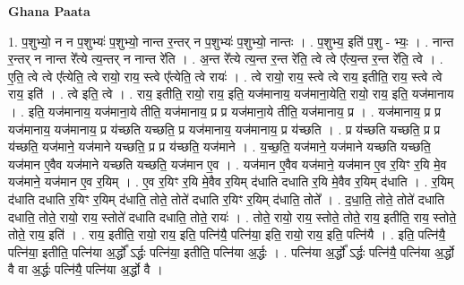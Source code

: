 \documentclass[17pt]{extarticle}
\begin{document}
\textbf{Ghana Paata } \newline

1. प॒शुभ्यो॒ न न प॒शुभ्यः॑ प॒शुभ्यो॒ नान्त र॒न्तर् न प॒शुभ्यः॑ प॒शुभ्यो॒ नान्तः । . प॒शुभ्य॒ इति॑ प॒शु - भ्यः॒ । . नान्त र॒न्तर् न नान्त रे᳚त्ये त्य॒न्तर् न नान्त रे॑ति । . अ॒न्त रे᳚त्ये त्य॒न्त र॒न्त रे॑ति॒ त्वे त्वे ए᳚त्य॒न्त र॒न्त रे॑ति॒ त्वे । . ए॒ति॒ त्वे त्वे ए᳚त्येति॒ त्वे रायो॒ राय॒ स्त्वे ए᳚त्येति॒ त्वे रायः॑ । . त्वे रायो॒ राय॒ स्त्वे त्वे राय॒ इतीति॒ राय॒ स्त्वे त्वे राय॒ इति॑ । . त्वे इति॒ त्वे । . राय॒ इतीति॒ रायो॒ राय॒ इति॒ यज॑मानाय॒ यज॑माना॒येति॒ रायो॒ राय॒ इति॒ यज॑मानाय । . इति॒ यज॑मानाय॒ यज॑माना॒ये तीति॒ यज॑मानाय॒ प्र प्र यज॑माना॒ये तीति॒ यज॑मानाय॒ प्र । . यज॑मानाय॒ प्र प्र यज॑मानाय॒ यज॑मानाय॒ प्र य॑च्छति यच्छति॒ प्र यज॑मानाय॒ यज॑मानाय॒ प्र य॑च्छति । . प्र य॑च्छति यच्छति॒ प्र प्र य॑च्छति॒ यज॑माने॒ यज॑माने यच्छति॒ प्र प्र य॑च्छति॒ यज॑माने । . य॒च्छ॒ति॒ यज॑माने॒ यज॑माने यच्छति यच्छति॒ यज॑मान ए॒वैव यज॑माने यच्छति यच्छति॒ यज॑मान ए॒व । . यज॑मान ए॒वैव यज॑माने॒ यज॑मान ए॒व र॒यिꣳ र॒यि मे॒व यज॑माने॒ यज॑मान ए॒व र॒यिम् । . ए॒व र॒यिꣳ र॒यि मे॒वैव र॒यिम् द॑धाति दधाति र॒यि मे॒वैव र॒यिम् द॑धाति । . र॒यिम् द॑धाति दधाति र॒यिꣳ र॒यिम् द॑धाति॒ तोते॒ तोते॑ दधाति र॒यिꣳ र॒यिम् द॑धाति॒ तोते᳚ । . द॒धा॒ति॒ तोते॒ तोते॑ दधाति दधाति॒ तोते॒ रायो॒ राय॒ स्तोते॑ दधाति दधाति॒ तोते॒ रायः॑ । . तोते॒ रायो॒ राय॒ स्तोते॒ तोते॒ राय॒ इतीति॒ राय॒ स्तोते॒ तोते॒ राय॒ इति॑ । . राय॒ इतीति॒ रायो॒ राय॒ इति॒ पत्नि॑यै॒ पत्नि॑या॒ इति॒ रायो॒ राय॒ इति॒ पत्नि॑यै । . इति॒ पत्नि॑यै॒ पत्नि॑या॒ इतीति॒ पत्नि॑या अ॒र्द्धो᳚ ऽर्द्धः पत्नि॑या॒ इतीति॒ पत्नि॑या अ॒र्द्धः । . पत्नि॑या अ॒र्द्धो᳚ ऽर्द्धः पत्नि॑यै॒ पत्नि॑या अ॒र्द्धो वै वा अ॒र्द्धः पत्नि॑यै॒ पत्नि॑या अ॒र्द्धो वै । \newline
\end{document}
